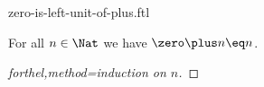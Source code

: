 \documentclass{naproche-library}
\begin{document}
\begin{smodule}[title=$0$ is Left-Unit of Addition]{zero-is-left-unit-of-plus.ftl}


\begin{proposition}[forthel,id=ZeroIsLeftUnitOfAddProp]
  For all $n \in \Nat$ we have $\zero \plus n \eq n$.
\end{proposition}
\begin{proof}[forthel,method=induction on $n$]\end{proof}

\end{smodule}
\end{document}
